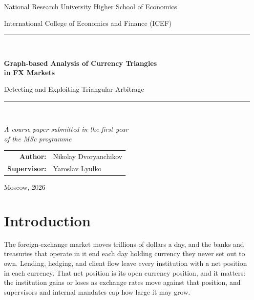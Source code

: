 \documentclass[12pt,a4paper]{article}
\newcommand{\InstUniversity}{National Research University Higher School of Economics}
\newcommand{\InstFaculty}{International College of Economics and Finance (ICEF)}
\newcommand{\InstSupervisor}{Yaroslav Lyulko}
\newcommand{\InstCity}{Moscow}
\begin{document}
\begin{titlepage}
\centering
\thispagestyle{empty}
{\large \InstUniversity\par}
{\normalsize \InstFaculty\par}
\vspace{2.6cm}
{\rule{\textwidth}{0.8pt}}\\[0.7cm]
{\LARGE\bfseries Graph-based Analysis of Currency Triangles\\[0.25em]
in FX Markets\par}
\vspace{0.5cm}
{\large Detecting and Exploiting Triangular Arbitrage\par}
\vspace{0.5cm}
{\rule{\textwidth}{0.8pt}}\\[1.6cm]
{\normalsize\itshape A course paper submitted in the first year\\
of the MSc programme\par}
\vfill
{\normalsize
\begin{tabular}{rl}
\bfseries Author: & Nikolay Dvoryanchikov\\[0.35em]
\bfseries Supervisor: & \InstSupervisor\\
\end{tabular}\par}
\vspace{1.2cm}
{\large \InstCity, 2026\par}
\end{titlepage}

\pagestyle{plain}
\setcounter{page}{1}

\tableofcontents
\clearpage

\pagestyle{fancy}

\section{Introduction}
\label{sec:intro}

The foreign-exchange market moves trillions of dollars a day, and the banks and treasuries
that operate in it end each day holding currency they never set out to own. Lending,
hedging, and client flow leave every institution with a net position in each currency. That
net position is its open currency position, and it matters: the institution gains or loses
as exchange rates move against that position, and supervisors and internal mandates cap how
large it may grow.
\end{document}
